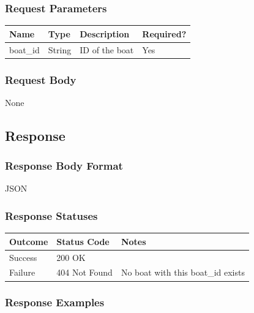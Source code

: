 \documentclass[letterpaper,11pt,titlepage,draftclsnofoot,onecolumn,compsoc,utf8,latin1]{IEEEtran}
\begin{document}
\begin{singlespace}
\subsubsection{Request Parameters}

\begin{center}
    \begin{tabular}{ | p{} | p{} | p{} | p{} |}
    \hline
        \textbf{Name} & \textbf{Type} & \textbf{Description} &\textbf{Required?}  \\ \hline
        boat\_id & String & ID of the boat & Yes \\
    \hline
    \end{tabular}
\end{center}

\subsubsection{Request Body}

None

\subsection{Response}
\subsubsection{Response Body Format}

JSON

\subsubsection{Response Statuses}

\begin{center}
\begin{tabular}{ |p{}|p{}|p{}| } 
 \hline
 \textbf{Outcome} & \textbf{Status Code} & \textbf{Notes}  \\  \hline
 Success & 200 OK &  \\ \hline
 Failure & 404 Not Found & No boat with this boat\_id exists \\ \hline
 \hline
\end{tabular}
\end{center}

\subsubsection{Response Examples}


\end{singlespace}
\end{document}
